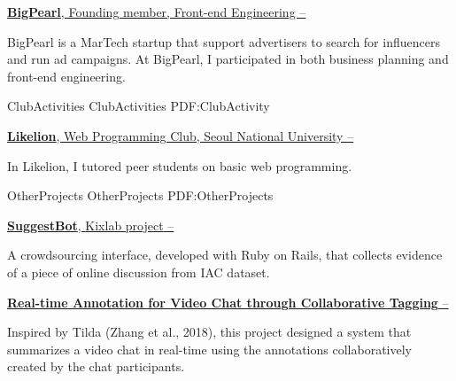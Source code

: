 \documentclass[letterpaper,MMMyyyy,nonstopmode]{template}
\begin{document}
\begin{Body}
\BigGap
\Entry
  \href{https://ad.bigpearl.io}
  {\textbf{BigPearl}, Founding member, Front-end Engineering
  \hfill
   --
  }
  \begin{Detail}
  \SubBulletItem
    BigPearl is a MarTech startup that support advertisers to search for influencers and run ad campaigns. \newline At BigPearl, I participated in both business planning and front-end engineering.
  \end{Detail}


\Section
{Club\newline Activities}
{Club\newline Activities}
{PDF:ClubActivity}

\BigGap
\Entry
  \href{https://likelion.net}
  {\textbf{Likelion}, Web Programming Club, Seoul National University
  \hfill
   --
  }

  \begin{Detail}
  \SubBulletItem
    In Likelion, I tutored peer students on basic web programming.
  \end{Detail}

\newpage
    
\Section
{Other\newline Projects}
{Other\newline Projects}
{PDF:OtherProjects}
  
\BigGap
\Entry
  \href{https://github.com/kixlab/suggestbot_rails/}
  {\textbf{SuggestBot}, {\small{Kixlab project}}
  \hfill
   --
  }

  \begin{Detail}
  \SubBulletItem
    A crowdsourcing interface, developed with Ruby on Rails, that collects evidence of a piece of online discussion from IAC dataset.
  \end{Detail}

\BigGap
\Entry
  \href{https://github.com/jyoonsong/RAVi}
  {\textbf{Real-time Annotation for Video Chat through Collaborative Tagging}
  \hfill
   --
  }

  \begin{Detail}
  \SubBulletItem
    Inspired by Tilda (Zhang et al., 2018), this project designed a system that summarizes a video chat in real-time using the annotations collaboratively created by the chat participants.
  \end{Detail}



\end{Body}
\end{document}
